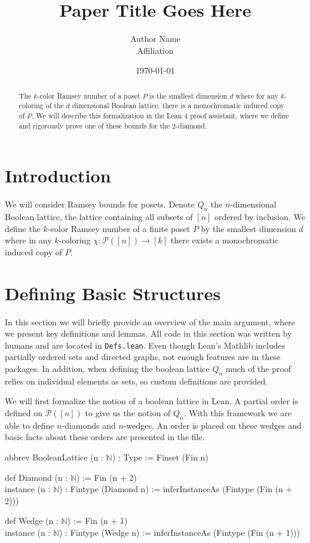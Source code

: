 \documentclass[11pt,letterpaper]{article}
\title{Paper Title Goes Here}
\author{Author Name \\ Affiliation}
\date{\today}
\newenvironment{code}
  {\par\medskip\ttfamily}
  {\par\medskip}
\begin{document}
\maketitle

\begin{abstract}
The $k$-color Ramsey number of a poset $P$ is the smallest dimension $d$ where for any $k$-coloring of the $d$ dimensional Boolean lattice, there is a monochromatic induced copy of $P$. We will describe this formalization in the Lean 4 proof assistant, where we define and rigorously prove one of these bounds for the 2-diamond.
\end{abstract}

\section{Introduction}
We will consider Ramsey bounds for posets. Denote $Q_n$ the $n$-dimensional Boolean lattice, the lattice containing all subsets of $[n]$ ordered by inclusion.
We define the $k$-color Ramsey number of a finite poset $P$ by the smallest dimension $d$ where in any $k$-coloring $\chi : \mathcal P([n]) \to [k]$ there exists a monochromatic induced copy of $P$. 


\section{Defining Basic Structures}

In this section we will briefly provide an overview of the main argument, where we present key definitions and lemmas. All code in this section was written by humans and are located in \texttt{Defs.lean}. Even though Lean's Mathlib includes partially ordered sets and directed graphs, not enough features are in these packages. In addition, when defining the boolean lattice $Q_n$ much of the proof relies on individual elements as sets, so custom definitions are provided.

We will first formalize the notion of a boolean lattice in Lean. A partial order is defined on $\mathcal P([n])$ to give us the notion of $Q_n$.
With this framework we are able to define $n$-diamonds and $n$-wedges. An order is placed on these wedges and basic facts about these orders are presented in the file.
\begin{code}
abbrev BooleanLattice (n : $\mathbb N$) : Type := Finset (Fin n)
    
def Diamond (n : $\mathbb N$) := Fin (n + 2) \\
instance (n : $\mathbb N$) : Fintype (Diamond n) := inferInstanceAs (Fintype (Fin (n + 2)))

def Wedge (n : $\mathbb N$) := Fin (n + 1) \\
instance (n : $\mathbb N$) : Fintype (Wedge n) := inferInstanceAs (Fintype (Fin (n + 1)))
\end{code}
\end{document}
